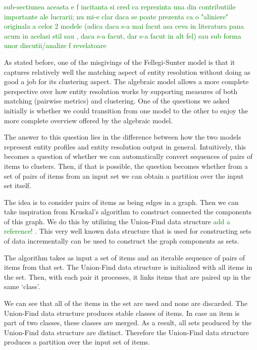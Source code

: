 
\textcolor{green}{sub-sectiunea aceasta e f incitanta si cred ca reprezinta una din contributiile importante ale lucrarii; nu mi-e clar daca se poate prezenta ca o "aliniere" originala a celor 2 modele (adica daca s-a mai facut asa ceva in literatura pana acum in acelasi stil sau , daca s-a facut, dar s-a facut in alt fel) sau sub forma unor discutii/analize f revelatoare}
    
As stated before, one of the misgivings of the Fellegi-Sunter model is that
it captures relatively well the matching aspect of entity resolution without
doing as good a job for its clustering aspect.
The algebraic model allows a more complete perspective over how entity
resolution works by supporting measures of both matching (pairwise metrics)
and clustering.
One of the questions we asked initially is whether we could transition from
one model to the other to enjoy the more complete overview offered by the
algebraic model.

The answer to this question lies in the difference between how the two
models represent entity profiles and entity resolution output in general.
Intuitively, this becomes a question of whether we can automatically convert
sequences of pairs of items to clusters.
Then, if that is possible, the question becomes whether from a set of pairs
of items from an input set we can obtain a partition over the input set
itself.

The idea is to consider pairs of items as being edges in a graph.
Then we can take inspiration from Kruskal's algorithm to construct connected
the components of this graph.
We do this by utilizing the Union-Find data structure 
\textcolor{green}{add a reference!}
.
This very well known data structure that is used for constructing sets of
data incrementally can be used to construct the graph components as sets.

The algorithm takes as input a set of items and an iterable sequence of
pairs of items from that set.
The Union-Find data structure is initialized with all items in the set.
Then, with each pair it processes, it links items that are paired up in
the same `class'.

We can see that all of the items in the set are used and none are discarded.
The Union-Find data structure produces stable classes of items.
In case an item is part of two classes, these classes are merged.
As a result, all sets produced by the Union-Find data structure are
distinct.
Therefore the Union-Find data structure produces a partition over the input
set of items.

